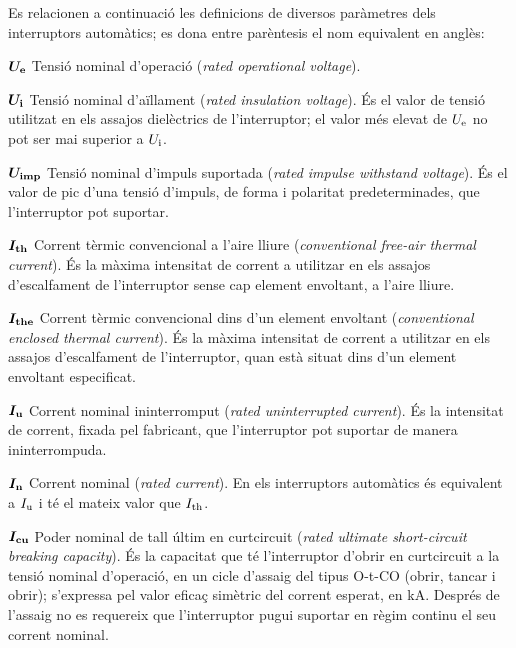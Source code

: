Es relacionen a continuació les definicions de diversos paràmetres dels interruptors automàtics; es dona entre parèntesis el nom equivalent en anglès:
\begin{list}{}
   {\setlength{\labelwidth}{10mm} \setlength{\leftmargin}{10mm} \setlength{\labelsep}{2mm}}
   \item[$\boldsymbol{U_\mathrm{e}}$] Tensió nominal d'operació (\textit{rated operational voltage}).
   \item[$\boldsymbol{U_\mathrm{i}}$] Tensió nominal d'aïllament (\textit{rated insulation voltage}). És el valor de tensió utilitzat en els assajos dielèctrics de l'interruptor;  el valor més elevat de $U_\mathrm{e}$ no pot ser mai superior a $U_\mathrm{i}$.
    \item[$\boldsymbol{U_\mathrm{imp}}$] Tensió nominal d'impuls suportada (\textit{rated impulse withstand voltage}). És el valor de pic d'una tensió d'impuls, de forma i polaritat predeterminades, que l'interruptor pot suportar.
   \item[$\boldsymbol{I_\mathrm{th}}$] Corrent tèrmic convencional a l'aire lliure (\textit{conventional free-air thermal current}).  És la  màxima intensitat de corrent a utilitzar en els assajos d'escalfament de l'interruptor sense cap element envoltant, a l'aire lliure.
   \item[$\boldsymbol{I_\mathrm{the}}$] Corrent tèrmic convencional dins d'un element envoltant (\textit{conventional enclosed thermal current}).  És la màxima intensitat de corrent a utilitzar en els assajos d'escalfament de l'interruptor, quan està situat dins d'un element envoltant especificat.
    \item[$\boldsymbol{I_\mathrm{u}}$] Corrent nominal ininterromput (\textit{rated uninterrupted current}).  És la intensitat  de corrent, fixada pel fabricant, que l'interruptor pot suportar de manera ininterrompuda.
    \item[$\boldsymbol{I_\mathrm{n}}$] Corrent nominal (\textit{rated current}).  En els interruptors automàtics és equivalent a $I_\mathrm{u}$ i té el mateix valor que $I_\mathrm{th}$.
    \item[$\boldsymbol{I_\mathrm{cu}}$] Poder nominal de tall últim en curtcircuit (\textit{rated ultimate  short-circuit breaking capacity}). És la capacitat que té l'interruptor d'obrir en curtcircuit a la tensió nominal d'operació, en un cicle d'assaig del tipus O-t-CO (obrir, tancar i obrir); s'expressa pel valor eficaç simètric del corrent esperat, en kA. Després de l'assaig no es requereix que l'interruptor pugui suportar en règim continu el seu corrent nominal.

\end{list}

